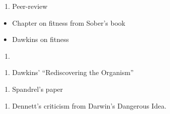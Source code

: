 \documentclass{article}
\begin{document}
\dia{}
\begin{enumerate}
\item Peer-review
\end{enumerate}

\dia{}
\begin{itemize}
\item Chapter on fitness from Sober's book
\end{itemize}

\dia{}
\begin{itemize}
\item Dawkins on fitness
\end{itemize}

\dia{}
\begin{enumerate}
\item {}
\end{enumerate}

\dia{}
\begin{enumerate}
\item Dawkins' ``Rediscovering the Organism''
\end{enumerate}

\dia{}
\begin{enumerate}
\item Spandrel's paper
\end{enumerate}

\dia{}
\begin{enumerate}
\item Dennett's criticism from Darwin's Dangerous Idea.
\end{enumerate}

\end{document}
